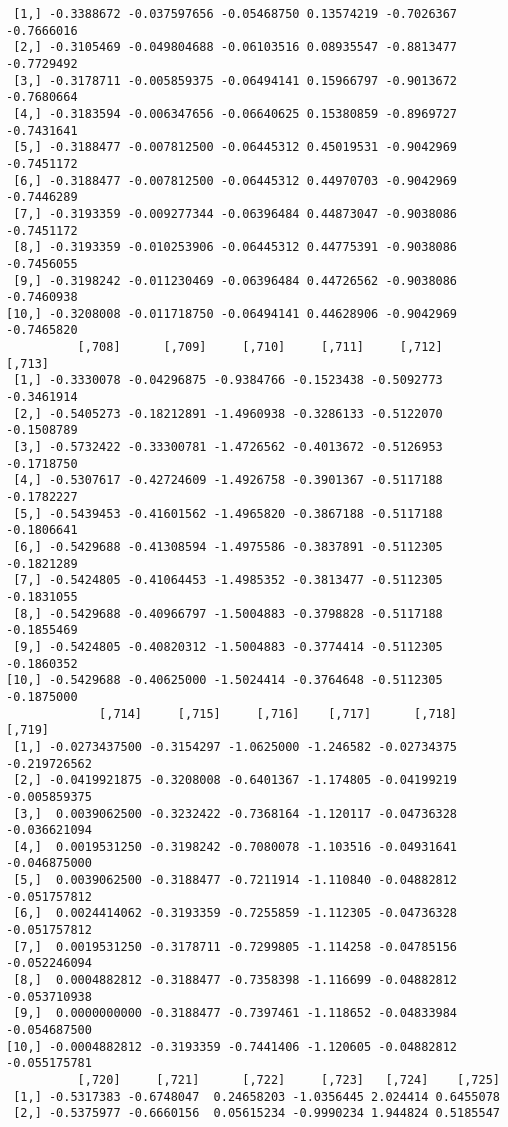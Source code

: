 \documentclass[
  letterpaper,
  DIV=11,
  numbers=noendperiod]{scrreprt}
\begin{document}
\begin{verbatim}
 [1,] -0.3388672 -0.037597656 -0.05468750 0.13574219 -0.7026367 -0.7666016
 [2,] -0.3105469 -0.049804688 -0.06103516 0.08935547 -0.8813477 -0.7729492
 [3,] -0.3178711 -0.005859375 -0.06494141 0.15966797 -0.9013672 -0.7680664
 [4,] -0.3183594 -0.006347656 -0.06640625 0.15380859 -0.8969727 -0.7431641
 [5,] -0.3188477 -0.007812500 -0.06445312 0.45019531 -0.9042969 -0.7451172
 [6,] -0.3188477 -0.007812500 -0.06445312 0.44970703 -0.9042969 -0.7446289
 [7,] -0.3193359 -0.009277344 -0.06396484 0.44873047 -0.9038086 -0.7451172
 [8,] -0.3193359 -0.010253906 -0.06445312 0.44775391 -0.9038086 -0.7456055
 [9,] -0.3198242 -0.011230469 -0.06396484 0.44726562 -0.9038086 -0.7460938
[10,] -0.3208008 -0.011718750 -0.06494141 0.44628906 -0.9042969 -0.7465820
          [,708]      [,709]     [,710]     [,711]     [,712]     [,713]
 [1,] -0.3330078 -0.04296875 -0.9384766 -0.1523438 -0.5092773 -0.3461914
 [2,] -0.5405273 -0.18212891 -1.4960938 -0.3286133 -0.5122070 -0.1508789
 [3,] -0.5732422 -0.33300781 -1.4726562 -0.4013672 -0.5126953 -0.1718750
 [4,] -0.5307617 -0.42724609 -1.4926758 -0.3901367 -0.5117188 -0.1782227
 [5,] -0.5439453 -0.41601562 -1.4965820 -0.3867188 -0.5117188 -0.1806641
 [6,] -0.5429688 -0.41308594 -1.4975586 -0.3837891 -0.5112305 -0.1821289
 [7,] -0.5424805 -0.41064453 -1.4985352 -0.3813477 -0.5112305 -0.1831055
 [8,] -0.5429688 -0.40966797 -1.5004883 -0.3798828 -0.5117188 -0.1855469
 [9,] -0.5424805 -0.40820312 -1.5004883 -0.3774414 -0.5112305 -0.1860352
[10,] -0.5429688 -0.40625000 -1.5024414 -0.3764648 -0.5112305 -0.1875000
             [,714]     [,715]     [,716]    [,717]      [,718]       [,719]
 [1,] -0.0273437500 -0.3154297 -1.0625000 -1.246582 -0.02734375 -0.219726562
 [2,] -0.0419921875 -0.3208008 -0.6401367 -1.174805 -0.04199219 -0.005859375
 [3,]  0.0039062500 -0.3232422 -0.7368164 -1.120117 -0.04736328 -0.036621094
 [4,]  0.0019531250 -0.3198242 -0.7080078 -1.103516 -0.04931641 -0.046875000
 [5,]  0.0039062500 -0.3188477 -0.7211914 -1.110840 -0.04882812 -0.051757812
 [6,]  0.0024414062 -0.3193359 -0.7255859 -1.112305 -0.04736328 -0.051757812
 [7,]  0.0019531250 -0.3178711 -0.7299805 -1.114258 -0.04785156 -0.052246094
 [8,]  0.0004882812 -0.3188477 -0.7358398 -1.116699 -0.04882812 -0.053710938
 [9,]  0.0000000000 -0.3188477 -0.7397461 -1.118652 -0.04833984 -0.054687500
[10,] -0.0004882812 -0.3193359 -0.7441406 -1.120605 -0.04882812 -0.055175781
          [,720]     [,721]      [,722]     [,723]   [,724]    [,725]
 [1,] -0.5317383 -0.6748047  0.24658203 -1.0356445 2.024414 0.6455078
 [2,] -0.5375977 -0.6660156  0.05615234 -0.9990234 1.944824 0.5185547

\end{verbatim}
\end{document}
